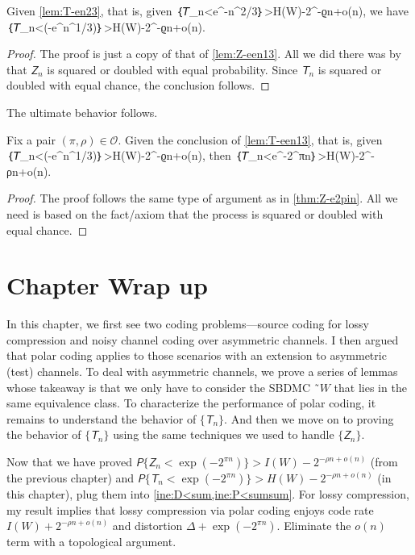\documentclass[openany]{amsbook}
\makeatletter
\numberwithin{equation}{chapter}
\numberwithin{figure}{chapter}
\numberwithin{table}{chapter}
\def\bigl@C#1{\bigl#1}					\def\bigr@C#1{\bigr#1}
\def\({\bigl@C(}	\def\){\bigr@C)}	令（{\Bigl(}			令）{\Bigr)}
\def\[#1\]{\begin{equation*}{#1}\end{equation*}}
\theoremstyle{definition}	理dfn:Definition~?s			理exa:Example~?s
\theoremstyle{remark}		理cla:Claim~?s				理rem:Remark~?s
\makeatother
\begin{document}
	\begin{lem}\label{lem:T-een13}
		Given \cref{lem:T-en23}, that is, given
		\[𝘗｛𝘛_n<e^{-n^{2/3}}｝>H(W)-2^{-ϱn+o(n)},\]
		we have
		\[𝘗｛𝘛_n<\exp\(-e^{n^{1/3}}\)｝>H(W)-2^{-ϱn+o(n)}.\]
	\end{lem}
	
	\begin{proof}
		The proof is just a copy of that of \cref{lem:Z-een13}.
		All we did there was by that $𝘡_n$ is squared or doubled with equal probability.
		Since $𝘛_n$ is squared or doubled with equal chance, the conclusion follows.
	\end{proof}
	
	The ultimate behavior follows.
	
	\begin{thm}\label{thm:T-e2pin}
		Fix a pair $(π,ρ)∈𝒪$.
		Given the conclusion of \cref{lem:T-een13}, that is, given
		\[𝘗｛𝘛_n<\exp\(-e^{n^{1/3}}\)｝>H(W)-2^{-ϱn+o(n)},\]
		then
		\[𝘗｛𝘛_n<e^{-2^{πn}}｝>H(W)-2^{-ρn+o(n)}.\]
	\end{thm}
	
	\begin{proof}
		The proof follows the same type of argument as in \cref{thm:Z-e2pin}.
		All we need is based on the fact/axiom that
		the process is squared or doubled with equal chance.
	\end{proof}

\section{Chapter Wrap up}

	In this chapter, we first see two coding problems---source coding for
	lossy compression and noisy channel coding over asymmetric channels.
	I then argued that polar coding applies to those scenarios
	with an extension to asymmetric (test) channels.
	To deal with asymmetric channels, we prove a series of lemmas whose takeaway is that
	we only have to consider the SBDMC $˜W$ that lies in the same equivalence class.
	To characterize the performance of polar coding,
	it remains to understand the behavior of $\{𝘛_n\}$.
	And then we move on to proving the behavior of $\{𝘛_n\}$
	using the same techniques we used to handle $\{𝘡_n\}$.
	
	Now that we have proved
	$𝘗\{𝘡_n<\exp(-2^{πn})\}>I(W)-2^{-ρn+o(n)}$ (from the previous chapter)
	and $𝘗\{𝘛_n<\exp(-2^{πn})\}>H(W)-2^{-ρn+o(n)}$ (in this chapter),
	plug them into \cref{ine:D<sum,ine:P<sumsum}.
	For lossy compression, my result implies that lossy compression via polar coding
	enjoys code rate $I(W)+2^{-ρn+o(n)}$ and distortion $Δ+\exp(-2^{πn})$.
	Eliminate the $o(n)$ term with a topological argument.
	
\end{document}

